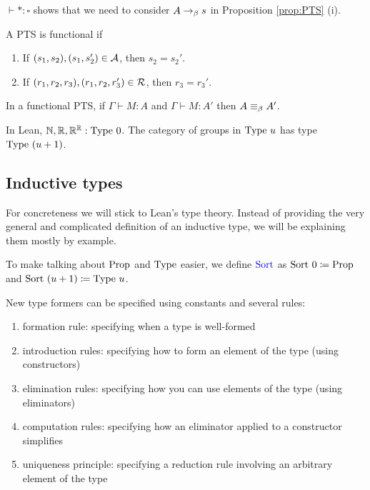 \begin{rem}
    $\vdash * : \square$ shows that we need to consider $A \to_{\beta} s$ in Proposition \ref{prop:PTS} (i).
\end{rem}

\begin{boxdefi}
    A PTS is \alert{functional} if 
    \begin{enumerate}
        \item If $(s_1, s_2), (s_1, s_2') \in \mathcal{A}$, then $s_2 =s_2'$.
        \item If $(r_1, r_2, r_3), (r_1, r_2, r_3') \in \mathcal{R}$, then $r_3 = r_3'$.
    \end{enumerate}
\end{boxdefi}

\begin{boxthm}
    In a functional PTS, if $\Gamma \vdash M : A$ and $\Gamma \vdash M : A'$ then $A \equiv_{\beta} A'$.
\end{boxthm}

\begin{rem}
    In Lean, $\mathbb{N}, \mathbb{R}, \mathbb{R}^{\mathbb{R}} : \mathrm{Type}\ 0$. 
    The category of groups in $\mathrm{Type}\ u$ has type $\mathrm{Type}\ (u + 1)$.
\end{rem}

\subsection{Inductive types}

For concreteness we will stick to Lean's type theory. 
Instead of providing the very general and complicated definition of an inductive type, we will be explaining them mostly by example. 

\begin{rem}
    To make talking about $\mathrm{Prop}$ and $\mathrm{Type}$ easier, we define $\alert{\sort}$ as $\mathrm{Sort}\ 0 \coloneq \mathrm{Prop}$ and $\mathrm{Sort}\ (u + 1) \coloneq \mathrm{Type}\ u$.
\end{rem}

\begin{boxdefi}
    New type formers can be specified using constants and several rules: 
    \begin{enumerate}
        \item \alert{formation rule}: specifying when a type is well-formed
        \item \alert{introduction rules}: specifying how to form an element of the type (using constructors)
        \item \alert{elimination rules}: specifying how you can use elements of the type (using eliminators)
        \item \alert{computation rules}: specifying how an eliminator applied to a constructor simplifies
        \item \alert{uniqueness principle}: specifying a reduction rule involving an arbitrary element of the type
    \end{enumerate}
\end{boxdefi}

